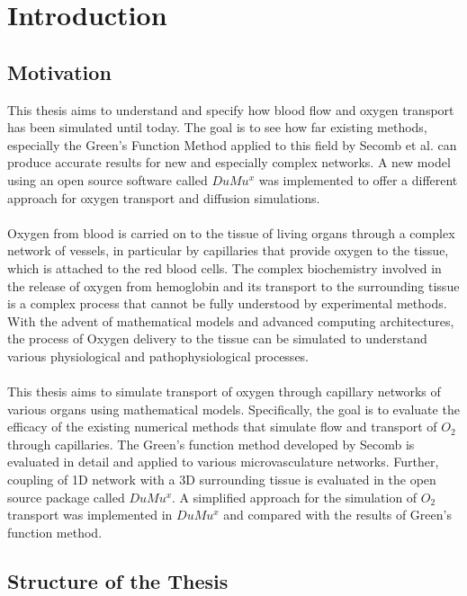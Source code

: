 
\section{Introduction}
\label{s:Introduction}

\subsection{Motivation}

This thesis aims to understand and specify how blood flow and oxygen transport has been simulated until today. The goal is to see how far existing methods, especially the Green's Function Method applied to this field by Secomb et al. \cite{Secomb2004} can produce accurate results for new and especially complex networks. A new model using an open source software called $DuMu^x$ \cite{flemischdumux} was implemented to offer a different approach for oxygen transport and diffusion simulations.\\
\\Oxygen from blood is carried on to the tissue of living organs through a
complex network of vessels, in particular by capillaries that provide oxygen to
the tissue, which is attached to the red blood cells. 
The complex biochemistry involved in the release of oxygen from hemoglobin and
its transport to the surrounding tissue is a complex process that cannot be
fully understood by experimental methods.
With the advent of mathematical models and advanced computing architectures,
the process of Oxygen delivery to the tissue can be simulated to understand
various physiological and pathophysiological processes.\\
\\This thesis aims to simulate transport of oxygen through capillary networks of
various organs using mathematical models.
Specifically, the goal is to evaluate the efficacy of the existing numerical
methods that simulate flow and transport of $O_2$ through capillaries.
The Green's function method developed by Secomb is evaluated in detail and
applied to various microvasculature networks.
Further, coupling of 1D network with a 3D surrounding tissue is evaluated in
the open source package called $DuMu^x$.
A simplified approach for the simulation of $O_2$ transport was implemented in
 $DuMu^x$ and compared with the results of Green's function method.

\subsection{Structure of the Thesis}

